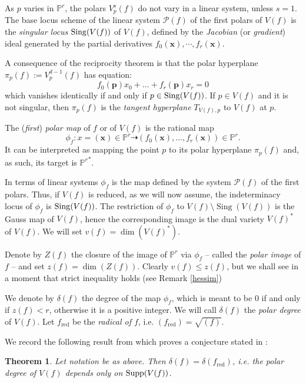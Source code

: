 \documentclass[11pt]{article}   %
\newtheorem{Theorem}{Theorem}
\theoremstyle{definition}
\numberwithin{Theorem}{section} \numberwithin{equation}{section}
\newcommand{\Sing}{\operatorname{Sing}}
\newcommand{\Proj}{{\mathbb P}}
\newcommand{\p}{{\mathbb P}}
\newcommand{\red}{\operatorname{red}}
\newcommand{\map}{\dasharrow}
\begin{document}
{As $p$ varies in $\Proj^ r$, the polars $V_p^ s(f)$ do not vary in a
linear system, unless $s=1$. The base locus scheme of the linear
system $\mathcal {P}(f)$ of the first polars of $V(f)$ is the {\it
singular locus\/} ${\rm Sing}(V(f))$ of $V(f)$, defined by the {\it
Jacobian\/} (or {\it gradient\/}) ideal generated by the partial
derivatives $f_0(\mathbf{x}),\cdots,f_r(\mathbf{x})$.


A consequence of the reciprocity theorem is that the polar
hyperplane $\pi_p(f):=V_p^ {d-1}(f)$ has equation:
$$f_0(\mathbf{p})x_0+\ldots+f_r(\mathbf{p})x_r=0$$
which vanishes identically if and only if $p\in {\rm Sing}(V(f))$.
If $p\in V(f)$ and it is not singular, then $\pi_p(f)$ is the {\it
tangent hyperplane} $T_{V(f),p}$ to $V(f)$ at $p$.


The ({\it first\/}) {\it polar map\/} of $f$ or of $V(f)$ is the
rational map
$$\phi_f: x=(\mathbf{x})\in \p^r\map
(f_0(\mathbf{x}),\ldots,f_r(\mathbf{x}))\in \p^{r}.$$ It can be
interpreted as mapping the point $p$  to its polar hyperplane
$\pi_p(f)$ and, as such, its target is ${\p^ r}^ *$.

In terms of linear systems $\phi_f$ is the map defined by the system
$\mathcal {P}(f)$ of the first polars. Thus, if $V(f)$ is reduced,
as we will now assume,  the indeterminacy locus
of $\phi_f$ is ${\rm Sing}(V(f))$. The restriction  of $\phi_f$ to
$V(f)\setminus\Sing(V(f))$ is the {Gauss map} of $V(f)$, hence the
corresponding image is the {dual variety} $V(f)^
*$ of $V(f)$. We will set $v(f)=\dim (V(f)^ *)$.

Denote by $Z(f)$ the closure of the image of $\Proj^ r$ via $\phi_f$
-- called the {\it polar image\/} of $f$ -- and set
$z(f)=\dim(Z(f))$. Clearly $v(f)\leq z(f)$, but we shall see in a moment
that strict inequality holds (see Remark \ref {hessim})

We denote by $\delta(f)$ the degree of the map $\phi_f$, which is
meant to be $0$ if and only if $z(f)<r$, otherwise it is a positive
integer. We will call $\delta(f)$ the {\it polar degree\/} of
$V(f)$. Let $f_{\red}$ be the {\it radical of $f$}, i.e.  $(f_{\red})=\sqrt{(f)}$.

We record the following result from \cite[Corollary 2]{DP} which
proves a conjecture stated in \cite{Dolgachev}:

\begin{Theorem} \label{nored} Let notation be as above.
Then $\delta(f)=\delta(f_{\red})$,  i.e. the polar degree of $V(f)$
depends only on ${\rm Supp}(V(f))$.
\end{Theorem}



}
\end{document}
